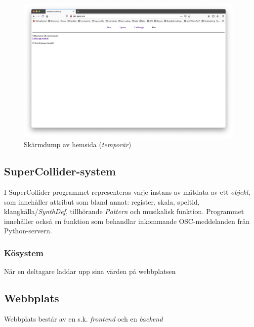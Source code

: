 \documentclass[11pt, twoside, a4paper]{article}
\begin{document}
\begin{multicols}{2}
\begin{figure}
\centering
\includegraphics[width=\textwidth]{../media/hemsida.png}
\caption{Skärmdump av hemsida (\emph{temporär})}
\label{hemsida}
\end{figure}

\subsection*{SuperCollider-system}
I SuperCollider-programmet representeras varje instans av mätdata av ett \emph{objekt}, som innehåller attribut som bland annat: register, skala, speltid, klangkälla/\emph{SynthDef}, tillhörande \emph{Pattern} och musikalisk funktion. Programmet innehåller också en funktion som behandlar inkommande OSC-meddelanden från Python-servern.


\subsubsection*{Kösystem}
När en deltagare laddar upp sina värden på webbplatsen   

\subsection*{Webbplats}
Webbplats består av en s.k. \emph{frontend} och en \emph{backend}

\end{multicols}
\end{document}
